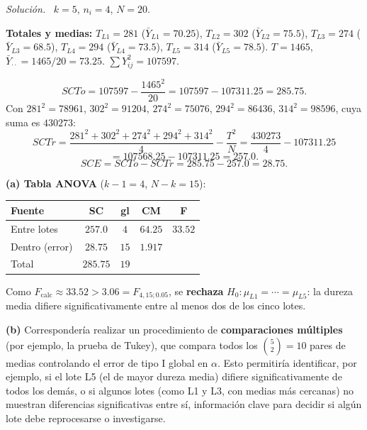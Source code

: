 \documentclass[11pt,a4paper]{article}
\newenvironment{solucion}{\par\noindent\textit{Solución.}~}{\par\vspace{1em}}
\begin{document}
\begin{solucion}
$k=5$, $n_i=4$, $N=20$.

\textbf{Totales y medias:} $T_{L1}=281$ ($\bar Y_{L1}=70.25$), $T_{L2}=302$ ($\bar Y_{L2}=75.5$), $T_{L3}=274$ ($\bar Y_{L3}=68.5$), $T_{L4}=294$ ($\bar Y_{L4}=73.5$), $T_{L5}=314$ ($\bar Y_{L5}=78.5$). $T=1465$, $\bar Y_{\cdot\cdot}=1465/20=73.25$. $\sum Y_{ij}^2=107597$.

\[
SCTo=107597-\frac{1465^2}{20}=107597-107311.25=285.75.
\]
Con $281^2=78961$, $302^2=91204$, $274^2=75076$, $294^2=86436$, $314^2=98596$, cuya suma es $430273$:
\[
SCTr=\frac{281^2+302^2+274^2+294^2+314^2}{4}-\frac{T^2}{N} = \frac{430273}{4}-107311.25
\]
\[
= 107568.25-107311.25 = 257.0.
\]
\[
SCE=SCTo-SCTr=285.75-257.0=28.75.
\]

\textbf{(a) Tabla ANOVA} ($k-1=4$, $N-k=15$):
\begin{table}[htbp]
\centering
\begin{tabular}{lcccc}
\toprule
Fuente & SC & gl & CM & F \\
\midrule
Entre lotes & $257.0$ & $4$ & $64.25$ & $33.52$ \\
Dentro (error) & $28.75$ & $15$ & $1.917$ & \\
\midrule
Total & $285.75$ & $19$ & & \\
\bottomrule
\end{tabular}
\end{table}

Como $F_{\text{calc}}\approx33.52 > 3.06=F_{4,15;0.05}$, se \textbf{rechaza} $H_0:\mu_{L1}=\cdots=\mu_{L5}$: la dureza media difiere significativamente entre al menos dos de los cinco lotes.

\textbf{(b)} Correspondería realizar un procedimiento de \textbf{comparaciones múltiples} (por ejemplo, la prueba de Tukey), que compara todos los $\binom{5}{2}=10$ pares de medias controlando el error de tipo I global en $\alpha$. Esto permitiría identificar, por ejemplo, si el lote L5 (el de mayor dureza media) difiere significativamente de todos los demás, o si algunos lotes (como L1 y L3, con medias más cercanas) no muestran diferencias significativas entre sí, información clave para decidir si algún lote debe reprocesarse o investigarse.
\end{solucion}
\end{document}
